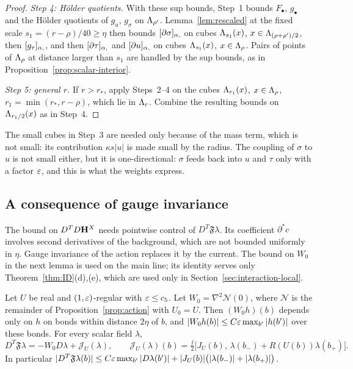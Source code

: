 \begin{proof}
\emph{Step 4: H\"older quotients.} With these sup bounds, Step~1 bounds $F_\bullet$, $g_\bullet$ and the H\"older quotients of $g_u$, $g_\sigma$ on $\Lambda_{\rho'}$. Lemma~\ref{lem:rescaled} at the fixed scale $s_1=(r-\rho)/40\ge\eta$ then bounds $[\partial\sigma]_{\alpha,}$ on cubes $\Lambda_{s_1}(x)$, $x\in\Lambda_{(\rho+\rho')/2}$, then $[g_\tau]_{\alpha,}$, and then $[\partial\tau]_{\alpha,}$ and $[\partial u]_{\alpha,}$ on cubes $\Lambda_{s_1}(x)$, $x\in\Lambda_\rho$. Pairs of points of $\Lambda_\rho$ at distance larger than $s_1$ are handled by the sup bounds, as in Proposition~\ref{prop:scalar-interior}.

\emph{Step 5: general $r$.} If $r>r_*$, apply Steps~2--4 on the cubes $\Lambda_{r_1}(x)$, $x\in\Lambda_\rho$, $r_1=\min(r_*,r-\rho)$, which lie in $\Lambda_r$. Combine the resulting bounds on $\Lambda_{r_1/2}(x)$ as in Step~4.
\end{proof}

The small cubes in Step~3 are needed only because of the mass term, which is not small: its contribution $\kappa s|u|$ is made small by the radius. The coupling of $\sigma$ to $u$ is not small either, but it is one-directional: $\sigma$ feeds back into $u$ and $\tau$ only with a factor $\varepsilon$, and this is what the weights express.

\subsection{A consequence of gauge invariance}\label{ss:36.3}

The bound on $D^TD\mathbf H^X$ needs pointwise control of $D^T\mathfrak F\lambda$. Its coefficient $\partial^*c$ involves second derivatives of the background, which are not bounded uniformly in $\eta$. Gauge invariance of the action replaces it by the current. The bound on $W_0$ in the next lemma is used on the main line; its identity serves only Theorem~\ref{thm:ID}(d),(e), which are used only in Section~\ref{sec:interaction-local}.

\begin{lemma}\label{lem:div-curvature}
Let $U$ be real and $(1,\varepsilon)$-regular with $\varepsilon\le c_5$. Let $W_0=\nabla^2\mathcal N(0)$, where $\mathcal N$ is the remainder of Proposition~\ref{prop:action} with $U_0=U$. Then $(W_0h)(b)$ depends only on $h$ on bonds within distance $2\eta$ of $b$, and $|W_0h(b)|\le C\varepsilon\max_{b'}|h(b')|$ over these bonds. For every scalar field $\lambda$,
\[
D^T\mathfrak F\lambda=-W_0D\lambda+\mathcal J_U(\lambda),\qquad\mathcal J_U(\lambda)(b)=\tfrac\ii2\big[J_U(b),\,\lambda(b_-)+R(U(b))\lambda(b_+)\big].
\]
In particular $|D^T\mathfrak F\lambda(b)|\le C\varepsilon\max_{b'}|D\lambda(b')|+|J_U(b)|\big(|\lambda(b_-)|+|\lambda(b_+)|\big)$.
\end{lemma}

